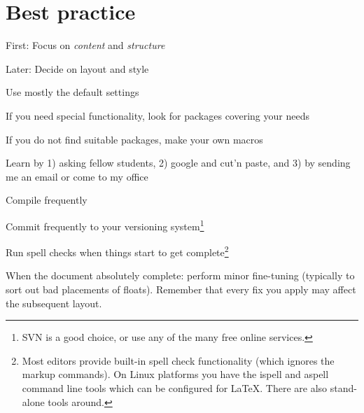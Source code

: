 \section{Best practice}
\label{sec:bestpractise}

\begin{compactitem}
\item First: Focus on {\em content} and {\em structure} 
\item Later: Decide on layout and style
\item Use mostly the default settings
\item If you need special functionality, look for packages covering your needs
\item If you do not find suitable packages, make your own macros
\item Learn by 1) asking fellow students, 2) google and cut'n paste, and 3) by sending me an email or come to my office
\item Compile frequently
\item Commit frequently to your versioning system\footnote{SVN is a good choice, or use any of the many free online services.}
\item Run spell checks when things start to get complete\footnote{Most editors provide built-in spell check functionality (which ignores the markup commands).  On Linux platforms you have the ispell and aspell command line tools which can be configured for \LaTeX. There are also stand-alone tools around.}
\item When the document absolutely complete: perform minor fine-tuning (typically to sort out bad placements of floats). Remember that every fix you apply may affect the subsequent layout.
\end{compactitem}



